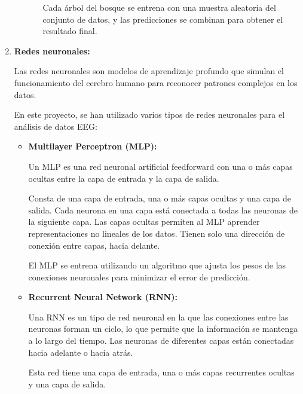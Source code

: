 \begin{enumerate}
\begin{itemize}
\begin{itemize}
	Cada árbol del bosque se entrena con una muestra aleatoria del conjunto de datos, y las predicciones se combinan para obtener el resultado final.
	
	

	\end{itemize}
\end{itemize}
	
\item
\textbf{Redes neuronales:}

	
	
Las redes neuronales son modelos de aprendizaje profundo que simulan el funcionamiento del cerebro humano para reconocer patrones complejos en los datos.

En este proyecto, se han utilizado varios tipos de redes neuronales para el análisis de datos EEG:		
	
\begin{itemize}

	\item
	\textbf{Multilayer Perceptron (MLP):}

	Un MLP es una red neuronal artificial feedforward con una o más capas ocultas entre la capa de entrada y la capa de salida.
	
	Consta de una capa de entrada, una o más capas ocultas y una capa de salida. Cada neurona en una capa está conectada a todas las neuronas de la siguiente capa. Las capas ocultas permiten al MLP aprender representaciones no lineales de los datos. Tienen solo una dirección de conexión entre capas, hacia delante.
	
	El MLP se entrena utilizando un algoritmo que ajusta los pesos de las conexiones neuronales para minimizar el error de predicción.
	
	

	

	\item
	\textbf{Recurrent Neural Network (RNN):}

	Una RNN es un tipo de red neuronal en la que las conexiones entre las neuronas forman un ciclo, lo que permite que la información se mantenga a lo largo del tiempo.  Las neuronas de diferentes capas están conectadas hacia adelante o hacia atrás.

	Esta red tiene una capa de entrada, una o más capas recurrentes ocultas y una capa de salida.
	
	




\end{itemize}
\end{enumerate}
